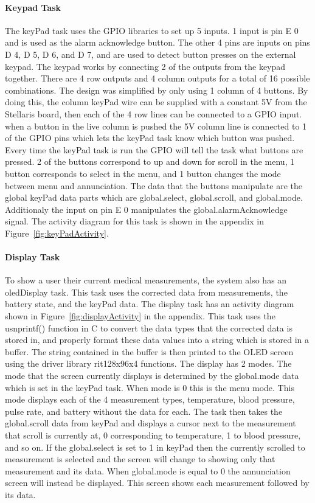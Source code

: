 \documentclass[12pt]{article} %
\begin{document}
    
    \paragraph{Keypad Task} The keyPad task uses the GPIO libraries to set up 5
    inputs. 1 input is pin E 0 and is used as the alarm acknowledge button. The
    other 4 pins are inputs on pins D 4, D 5, D 6, and D 7, and are used to
    detect button presses on the external keypad. The keypad works by
    connecting 2 of the outputs from the keypad together. There are 4 row
    outputs and 4 column outputs for a total of 16 possible combinations. The
    design was simplified by only using 1 column of 4 buttons. By doing this,
    the column keyPad wire can be supplied with a constant 5V from the
    Stellaris board, then each of the 4 row lines can be connected to a GPIO
    input. when a button in the live column is pushed the 5V column line is
    connected to 1 of the GPIO pins which lets the keyPad task know which
    button was pushed. Every time the keyPad task is run the GPIO will tell the
    task what buttons are pressed. 2 of the buttons correspond to up and down
    for scroll in the menu, 1 button corresponds to select in the menu, and 1
    button changes the mode between menu and annunciation. The data that the
    buttons manipulate are the global keyPad data parts which are
    global.select, global.scroll, and global.mode. Additionaly the input on pin
    E 0 manipulates the global.alarmAcknowledge signal. The activity diagram
    for this task is shown in the appendix in Figure~\ref{fig:keyPadActivity}.
    \paragraph{Display Task} To show a user their current medical measurements,
    the system also has an oledDisplay task. This task uses the corrected data
    from measurements, the battery state, and the keyPad data. The display task
    has an activity diagram shown in Figure~\ref{fig:displayActivity} in the
    appendix. This task uses the usnprintf() function in C to convert the data
    types that the corrected data is stored in, and properly format these data
    values into a string which is stored in a buffer. The string contained in
    the buffer is then printed to the OLED screen using the driver library
    rit128x96x4 functions. The display has 2 modes. The mode that the screen
    currently displays is determined by the global.mode data which is set in
    the keyPad task. When mode is 0 this is the menu mode. This mode displays
    each of the 4 measurement types, temperature, blood pressure, pulse rate,
    and battery without the data for each. The task then takes the
    global.scroll data from keyPad and displays a cursor next to the
    measurement that scroll is currently at, 0 corresponding to temperature, 1
    to blood pressure, and so on. If the global.select is set to 1 in keyPad
    then the currently scrolled to measurement is selected and the screen will
    change to showing only that measurement and its data. When global.mode is
    equal to 0 the annunciation screen will instead be displayed. This screen
    shows each measurement followed by its data.
    
\end{document}

